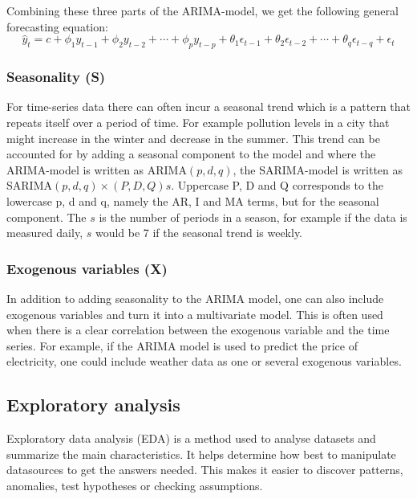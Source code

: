 Combining these three parts of the ARIMA-model, we get the following general forecasting equation:
\begin{equation}
\hat{y}_t = c + \phi_1y_{t-1} + \phi_2y_{t-2} + \cdots + \phi_py_{t-p} + \theta_1\epsilon_{t-1} + \theta_2\epsilon_{t-2} + \cdots + \theta_q\epsilon_{t-q} + \epsilon_t
\end{equation}

\subsubsection{Seasonality (S)}\label{SeasonalityTheory}
For time-series data there can often incur a seasonal trend which is a pattern that repeats itself over a period of time. For example pollution levels in a city that might increase in the winter and decrease in the summer. This trend can be accounted for by adding a seasonal component to the model and where the ARIMA-model is written as ARIMA$(p,d,q)$, the SARIMA-model is written as SARIMA$(p,d,q) \times (P,D,Q)s$. Uppercase P, D and Q corresponds to the lowercase p, d and q, namely the AR, I and MA terms, but for the seasonal component. The $s$ is the number of periods in a season, for example if the data is measured daily, $s$ would be 7 if the seasonal trend is weekly.~\parencite{chang_et_al_2012}

\subsubsection{Exogenous variables (X)}\label{ExogenousTheory}
In addition to adding seasonality to the ARIMA model, one can also include exogenous variables and turn it into a multivariate model. This is often used when there is a clear correlation between the exogenous variable and the time series. For example, if the ARIMA model is used to predict the price of electricity, one could include weather data as one or several exogenous variables.~\parencite{elamin_fukushige_2018}


\subsection{Exploratory analysis}
Exploratory data analysis (EDA) is a method used to analyse datasets and summarize the main characteristics. It helps determine how best to manipulate datasources to get the answers needed. This makes it easier to discover patterns, anomalies, test hypotheses or checking assumptions. 

